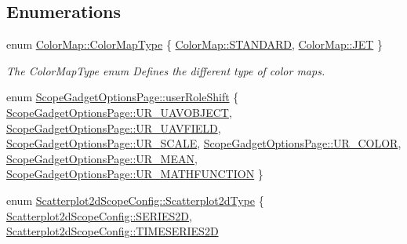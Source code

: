 \subsection*{\-Enumerations}
\begin{DoxyCompactItemize}
\item 
enum \hyperlink{group___scope_plugin_ga7f4f087196557757ec8061242e795031}{\-Color\-Map\-::\-Color\-Map\-Type} \{ \hyperlink{group___scope_plugin_gga7f4f087196557757ec8061242e795031ada2d98ce081f031c9195188175d92d44}{\-Color\-Map\-::\-S\-T\-A\-N\-D\-A\-R\-D}, 
\hyperlink{group___scope_plugin_gga7f4f087196557757ec8061242e795031a022cb7b62aaf4ea9c2c48375d4b187d8}{\-Color\-Map\-::\-J\-E\-T}
 \}
\begin{DoxyCompactList}\small\item\em \-The \-Color\-Map\-Type enum \-Defines the different type of color maps. \end{DoxyCompactList}\item 
enum \hyperlink{group___scope_plugin_gabc55f54668fc1565f24893b44bc2affe}{\-Scope\-Gadget\-Options\-Page\-::user\-Role\-Shift} \{ \*
\hyperlink{group___scope_plugin_ggabc55f54668fc1565f24893b44bc2affea1ca47671f95b0080d7fec89b625ecdae}{\-Scope\-Gadget\-Options\-Page\-::\-U\-R\-\_\-\-U\-A\-V\-O\-B\-J\-E\-C\-T}, 
\hyperlink{group___scope_plugin_ggabc55f54668fc1565f24893b44bc2affea9d7b3ed8977c973cd47ec9c590888e83}{\-Scope\-Gadget\-Options\-Page\-::\-U\-R\-\_\-\-U\-A\-V\-F\-I\-E\-L\-D}, 
\hyperlink{group___scope_plugin_ggabc55f54668fc1565f24893b44bc2affeacf5de4c7658c11db0a432311ce7e302e}{\-Scope\-Gadget\-Options\-Page\-::\-U\-R\-\_\-\-S\-C\-A\-L\-E}, 
\hyperlink{group___scope_plugin_ggabc55f54668fc1565f24893b44bc2affea9314bed2c7220cb80e1c7e1c643e7af8}{\-Scope\-Gadget\-Options\-Page\-::\-U\-R\-\_\-\-C\-O\-L\-O\-R}, 
\*
\hyperlink{group___scope_plugin_ggabc55f54668fc1565f24893b44bc2affea43e3a9f89e27568aa426874ed469620a}{\-Scope\-Gadget\-Options\-Page\-::\-U\-R\-\_\-\-M\-E\-A\-N}, 
\hyperlink{group___scope_plugin_ggabc55f54668fc1565f24893b44bc2affeab9a9633c8bc6a72c30f2a2962ff1e882}{\-Scope\-Gadget\-Options\-Page\-::\-U\-R\-\_\-\-M\-A\-T\-H\-F\-U\-N\-C\-T\-I\-O\-N}
 \}
\item 
enum \hyperlink{group___scope_plugin_gac3cffd2a84d02f4ebfba6df970d03e97}{\-Scatterplot2d\-Scope\-Config\-::\-Scatterplot2d\-Type} \{ \hyperlink{group___scope_plugin_ggac3cffd2a84d02f4ebfba6df970d03e97a8ac04199dbef37beba1b81fe42278b3a}{\-Scatterplot2d\-Scope\-Config\-::\-S\-E\-R\-I\-E\-S2\-D}, 
\hyperlink{group___scope_plugin_ggac3cffd2a84d02f4ebfba6df970d03e97af135d74488370bcdd47ee9744b513263}{\-Scatterplot2d\-Scope\-Config\-::\-T\-I\-M\-E\-S\-E\-R\-I\-E\-S2\-D}

\end{DoxyCompactItemize}
